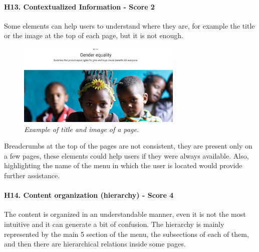 \newline
\newline \paragraph{H13. Contextualized Information - Score 2}  \label{subsec:H13}	Some elements can help users to understand where they are, for example the title or the image at the top of each page, but it is not enough.
\begin{figure}[!h]
	\begin{center}
		\includegraphics[width=0.7\textwidth]{FinalScores17.jpg}
		\captionsetup{font=small}
		\caption{\textit{Example of title and image of a page.}}
	\end{center}
\end{figure}
\newline Breadcrumbs at the top of the pages are not consistent, they are present only on a few pages, these elements could help users if they were always available.
\newline Also, highlighting the name of the menu in which the user is located would provide further assistance.
\newline
\newline \paragraph{H14. Content organization (hierarchy) - Score 4}  \label{subsec:H14}	The content is organized in an understandable manner, even it is not the most intuitive and it can generate a bit of confusion.
\newline The hierarchy is mainly represented by the main 5 section of the menu, the subsections of each of them, and then there are hierarchical relations inside some pages.   
